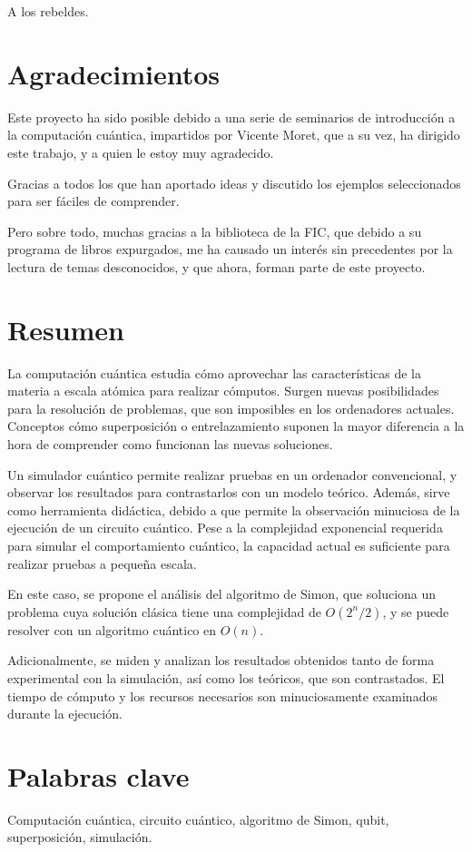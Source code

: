 \begin{dedication}
A los rebeldes.
\end{dedication}

\thispagestyle{empty}
\cleardoublepage
\chapter*{Agradecimientos}

Este proyecto ha sido posible debido a una serie de seminarios de introducción a 
la computación cuántica, impartidos por Vicente Moret, que a su vez, ha dirigido 
este trabajo, y a quien le estoy muy agradecido.

Gracias a todos los que han aportado ideas y discutido los ejemplos 
seleccionados para ser fáciles de comprender.

Pero sobre todo, muchas gracias a la biblioteca de la FIC, que debido a su 
programa de libros expurgados, me ha causado un interés sin precedentes por la 
lectura de temas desconocidos, y que ahora, forman parte de este proyecto.

\clearpage
\thispagestyle{empty}
\cleardoublepage

\chapter*{Resumen}
\noindent
La computación cuántica estudia cómo aprovechar las características de la 
materia a escala atómica para realizar cómputos. Surgen nuevas posibilidades 
para la resolución de problemas, que son imposibles en los ordenadores actuales.  
Conceptos cómo superposición o entrelazamiento suponen la mayor diferencia a la 
hora de comprender como funcionan las nuevas soluciones.

Un simulador cuántico permite realizar pruebas en un ordenador convencional, y 
observar los resultados para contrastarlos con un modelo teórico. Además, sirve 
como herramienta didáctica, debido a que permite la observación minuciosa de la 
ejecución de un circuito cuántico. Pese a la complejidad exponencial requerida 
para simular el comportamiento cuántico, la capacidad actual es suficiente para 
realizar pruebas a pequeña escala.

En este caso, se propone el análisis del algoritmo de Simon, que soluciona un 
problema cuya solución clásica tiene una complejidad de $O(2^n/2)$, y se puede 
resolver con un algoritmo cuántico en $O(n)$.

Adicionalmente, se miden y analizan los resultados obtenidos tanto de forma 
experimental con la simulación, así como los teóricos, que son contrastados. El 
tiempo de cómputo y los recursos necesarios son minuciosamente examinados 
durante la ejecución.


{\let\clearpage\relax \chapter{Palabras clave}}
\noindent
Computación cuántica, circuito cuántico, algoritmo de Simon, qubit,
superposición, simulación.
